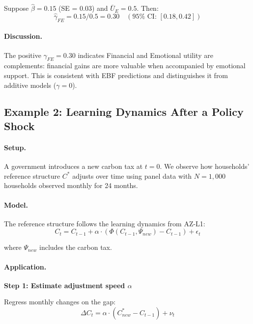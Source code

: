 Suppose $\hat{\beta} = 0.15$ (SE = 0.03) and $\bar{U}_E = 0.5$. Then:
\begin{equation}
\hat{\gamma}_{FE} = 0.15 / 0.5 = 0.30 \quad (95\% \text{ CI: } [0.18, 0.42])
\end{equation}

\paragraph{Discussion.}

The positive $\gamma_{FE} = 0.30$ indicates Financial and Emotional utility
are complements: financial gains are more valuable when accompanied by emotional
support. This is consistent with EBF predictions and distinguishes it from
additive models ($\gamma = 0$).


\subsection{Example 2: Learning Dynamics After a Policy Shock}

\paragraph{Setup.}
A government introduces a new carbon tax at $t=0$. We observe how households'
reference structure $C^*$ adjusts over time using panel data with $N = 1,000$
households observed monthly for 24 months.

\paragraph{Model.}
The reference structure follows the learning dynamics from AZ-L1:
\begin{equation}
C_t = C_{t-1} + \alpha \cdot (\Phi(C_{t-1}, \Psi_{new}) - C_{t-1}) + \epsilon_t
\end{equation}

where $\Psi_{new}$ includes the carbon tax.

\paragraph{Application.}

\textbf{Step 1: Estimate adjustment speed $\alpha$}

Regress monthly changes on the gap:
\begin{equation}
\Delta C_t = \alpha \cdot (C^*_{new} - C_{t-1}) + \nu_t
\end{equation}

